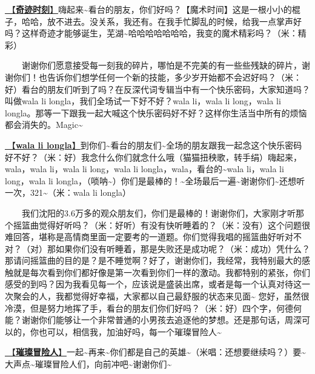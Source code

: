 \documentclass[]{ctexbook}
\begin{document}
\hyperref[magic-moment]{🎵【\textbf{奇迹时刻}】}嗨起来\textasciitilde 看台的朋友，你们好吗？【魔术时间】这是一根小小的棍子，哈哈，放不进去。没关系，我还有。在我手忙脚乱的时候，给我一点掌声好吗？这样奇迹才能够诞生，芜湖\textasciitilde 哈哈哈哈哈哈哈，我变的魔术精彩吗？（米：精彩）

  谢谢你们愿意接受每一刻我的碎片，哪怕是不完美的有一些些残缺的碎片，谢谢你们！也告诉你们想学任何一个新的技能，多少岁开始都不会迟好吗？（米：好）看台的朋友们听到了吗？在反深代词专辑当中有一个快乐密码，大家知道吗？叫做wala li longla，我们全场试一下好不好？wala li，wala li long，wala li longla。那等一下跟我一起大喊这个快乐密码好不好？这样你生活当中所有的烦恼都会消失的。Magic\textasciitilde{}

\hyperref[wala-li-longla]{🎵【\textbf{wala li longla}】}到你们\textasciitilde 看台的朋友们\textasciitilde 全场的朋友跟我一起念这个快乐密码好不好？（米：好）我念什么你们就念什么哦（猫猫扭秧歌，转手绢）嗨起来，wala，wala li，wala li long，wala li longla，wala，看台的\textasciitilde wala li，wala li long，wala li longla，（唢呐\textasciitilde）你们是最棒的！\textasciitilde 全场最后一遍\textasciitilde 谢谢你们\textasciitilde 还想听一次，321\textasciitilde（米：wala li longla）

  我们沈阳的3.6万多的观众朋友们，你们是最棒的！谢谢你们，大家刚才听那个摇篮曲觉得好听吗？（米：好听）有没有快听睡着的？（米：没有）这个问题很难回答，堪称是高情商里面一定要考的一道题。你们觉得我唱的摇篮曲好听对不对？（对）那如果你们没有听睡着，那是失败还是成功呢？（米：成功）凭什么？那请问摇篮曲的目的是？是不睡觉啊？好了，谢谢你们，我经常，我特别最大的感触就是每次看到你们都好像是第一次看到你们一样的激动。我都特别的紧张，你们感受的到吗？因为我看见每一个，应该说是盛装出席，或者是每一个认真对待这一次聚会的人，我都觉得好幸福，大家都以自己最舒服的状态来见面\textasciitilde{}
您好，虽然很冷漠，但是努力地挥了手，看台的朋友们你们好吗？（米：好）四个字，何德何能？谢谢你们能够让一个非常普通的小男孩去追逐他的梦想。还是那句话，周深可以的，你也可以，相信我，加油好吗，每一个璀璨冒险人\textasciitilde{}

\hyperref[adventurers]{🎵【\textbf{璀璨冒险人}】}一起\textasciitilde 再来\textasciitilde 你们都是自己的英雄\textasciitilde（米唱：还想要继续吗？）要\textasciitilde 大声点\textasciitilde 璀璨冒险人们，向前冲吧\textasciitilde 谢谢你们\textasciitilde{}
\end{document}
